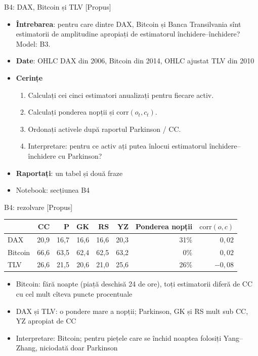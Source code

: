 \begin{frame}{B4: DAX, Bitcoin și TLV [Propus]}
\itemsize{\footnotesize}
\begin{itemize}
\item \textbf{Întrebarea}: pentru care dintre DAX, Bitcoin și Banca Transilvania sînt estimatorii de amplitudine apropiați de estimatorul închidere--închidere? Model: B3.
\item \textbf{Date}: OHLC DAX din 2006, Bitcoin din 2014, OHLC ajustat TLV din 2010
\item \textbf{Cerințe}
\begin{enumerate}
    \item Calculați cei cinci estimatori anualizați pentru fiecare activ.
    \item Calculați ponderea nopții și $\mathrm{corr}(o_t, c_t)$.
    \item Ordonați activele după raportul Parkinson / CC.
    \item Interpretare: pentru ce activ ați putea înlocui estimatorul închidere--închidere cu Parkinson?
\end{enumerate}
\item \textbf{Raportați}: un tabel și două fraze
\item Notebook: secțiunea B4
\end{itemize}
\end{frame}

\ifsolutions
\begin{frame}{B4: rezolvare [Propus]}
\itemsize{\footnotesize}
\begin{center}
\footnotesize
\begin{tabular}{lrrrrrrr}
\toprule
& CC & P & GK & RS & YZ & \textbf{Ponderea nopții} & $\mathrm{corr}(o, c)$ \\
\midrule
DAX & 20{,}9 & 16{,}7 & 16{,}6 & 16{,}6 & 20{,}3 & 31\% & ${0{,}02}$ \\
Bitcoin & 66{,}6 & 63{,}5 & 62{,}4 & 62{,}5 & 63{,}2 & 0\% & ${0{,}02}$ \\
TLV & 26{,}6 & 21{,}5 & 20{,}6 & 21{,}0 & 25{,}6 & 26\% & ${-0{,}08}$ \\
\bottomrule
\end{tabular}
\end{center}
\begin{itemize}
    \item Bitcoin: fără noapte (piață deschisă 24 de ore), toți estimatorii diferă de CC cu cel mult cîteva puncte procentuale
    \item DAX și TLV: o pondere mare a nopții; Parkinson, GK și RS mult sub CC, YZ apropiat de CC
    \item Interpretare: Bitcoin; pentru piețele care se închid noaptea folosiți Yang--Zhang, niciodată doar Parkinson
\end{itemize}
\end{frame}
\fi


